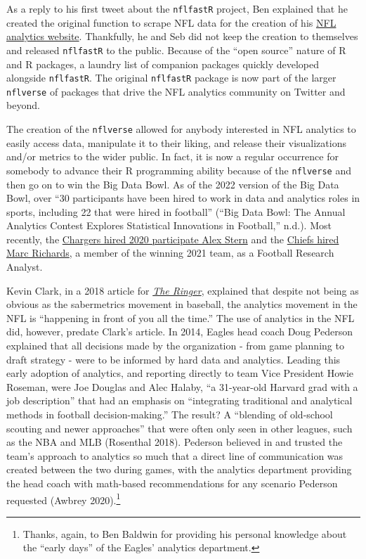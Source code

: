 \documentclass[
  letterpaper,
]{krantz}
\begin{document}
As a reply to his first tweet about the \texttt{nflfastR} project, Ben
explained that he created the original function to scrape NFL data for
the creation of his \href{https://rbsdm.com/stats/stats/}{NFL analytics
website}. Thankfully, he and Seb did not keep the creation to themselves
and released \texttt{nflfastR} to the public. Because of the ``open
source'' nature of R and R packages, a laundry list of companion
packages quickly developed alongside \texttt{nflfastR}. The original
\texttt{nflfastR} package is now part of the larger \texttt{nflverse} of
packages that drive the NFL analytics community on Twitter and beyond.

The creation of the \texttt{nflverse} allowed for anybody interested in
NFL analytics to easily access data, manipulate it to their liking, and
release their visualizations and/or metrics to the wider public. In
fact, it is now a regular occurrence for somebody to advance their R
programming ability because of the \texttt{nflverse} and then go on to
win the Big Data Bowl. As of the 2022 version of the Big Data Bowl, over
``30 participants have been hired to work in data and analytics roles in
sports, including 22 that were hired in football'' ({``Big Data Bowl:
The Annual Analytics Contest Explores Statistical Innovations in
Football,''} n.d.). Most recently, the
\href{https://www.boltsfromtheblue.com/2021/7/9/22570490/chargers-news-nfl-big-data-bowl}{Chargers
hired 2020 participate Alex Stern} and the
\href{https://twitter.com/sethwalder/status/1532721476209627136}{Chiefs
hired Marc Richards}, a member of the winning 2021 team, as a Football
Research Analyst.

Kevin Clark, in a 2018 article for
\href{https://www.theringer.com/nfl/2018/12/19/18148153/nfl-analytics-revolution}{\emph{The
Ringer}}, explained that despite not being as obvious as the
sabermetrics movement in baseball, the analytics movement in the NFL is
``happening in front of you all the time.'' The use of analytics in the
NFL did, however, predate Clark's article. In 2014, Eagles head coach
Doug Pederson explained that all decisions made by the organization -
from game planning to draft strategy - were to be informed by hard data
and analytics. Leading this early adoption of analytics, and reporting
directly to team Vice President Howie Roseman, were Joe Douglas and Alec
Halaby, ``a 31-year-old Harvard grad with a job description'' that had
an emphasis on ``integrating traditional and analytical methods in
football decision-making.'' The result? A ``blending of old-school
scouting and newer approaches'' that were often only seen in other
leagues, such as the NBA and MLB (Rosenthal 2018). Pederson believed in
and trusted the team's approach to analytics so much that a direct line
of communication was created between the two during games, with the
analytics department providing the head coach with math-based
recommendations for any scenario Pederson requested (Awbrey
2020).\footnote{Thanks, again, to Ben Baldwin for providing his personal
  knowledge about the ``early days'' of the Eagles' analytics
  department.}
\end{document}
